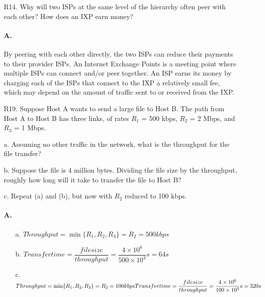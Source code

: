 \documentclass[]{article}
\begin{document}
\begin{enumerate}
\begin{itemize}
\begin{adjustwidth}{0.3cm}{0cm}
\begin{enumerate}
				\item The sequence of message the receiving host gets will keep the same as it being sent.
			\end{enumerate}
		\end{adjustwidth}
	
		\item As for the advantage TDM has over FDM, it is obvious that TDM can \textbf{support many more users} one time than FDM can.
	\end{itemize}
	
	\item[R14.]
	Why will two ISPs at the same level of the hierarchy often peer with each
	other? How does an IXP earn money?
	
	\paragraph{A.}
	By peering with each other directly, the two ISPs can reduce their payments to their provider ISPs. An Internet Exchange Points is a meeting point where multiple ISPs can connect and/or peer together. An ISP earns its money by charging each of the ISPs that connect to the IXP a relatively small fee, which may depend on the amount of traffic sent to or received from the IXP.
	
	\item[R19.]
	Suppose Host A wants to send a large file to Host B. The path from Host A to
	Host B has three links, of rates $R_{1}$ = 500 kbps, $R_{2}$ = 2 Mbps, and $R_{3}$ = 1 Mbps.
	
	a. Assuming no other traffic in the network, what is the throughput for the
	file transfer?
	
	b. Suppose the file is 4 million bytes. Dividing the file size by the throughput,
	roughly how long will it take to transfer the file to Host B?
	
	c. Repeat (a) and (b), but now with $R_{2}$ reduced to 100 kbps.
	
	\paragraph{A.}
	\begin{enumerate}
		\item[a.] $Throughput =  \min\{R_{1}, R_{2}, R_{3}\} = R_{2} = 500 kbps $
		\item[b.] $Transfer time = \dfrac{file size}{throughput} = \dfrac{4 \times 10^{6}}{500 \times 10^{3}}s = 64 s$
		\item[c.] $Throughput = \min\{R_{1}, R_{2}, R_{3}\} = R_{2} = 100 kbps
		\\
		Transfer time = \dfrac{file size}{throughput} = \dfrac{4 \times 10^{6}}{100 \times 10^{3}}s = 320 s$
	\end{enumerate}
		

\end{enumerate}
\end{document}
